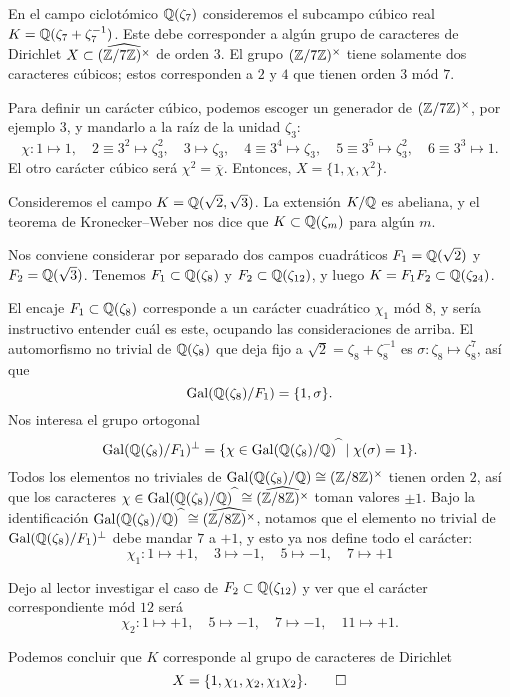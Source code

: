 \begin{ejemplo}
  \label{ej:Q-zeta-7-real-caracteres}
  En el campo ciclotómico $\mathbb{Q} (\zeta_7)$ consideremos el subcampo cúbico real
  $K = \mathbb{Q} (\zeta_7 + \zeta_7^{-1})$. Este debe corresponder a algún grupo de
  caracteres de Dirichlet $X \subset \widehat{(\mathbb{Z}/7\mathbb{Z})^\times}$ de orden $3$.
  El grupo $(\mathbb{Z}/7\mathbb{Z})^\times$ tiene solamente dos caracteres cúbicos;
  estos corresponden a $2$ y $4$ que tienen orden $3$ mód $7$.

  Para definir un carácter cúbico, podemos escoger un generador de
  $(\mathbb{Z}/7\mathbb{Z})^\times$, por ejemplo $3$, y mandarlo a la raíz de la unidad
  $\zeta_3$:
  \[ \chi\colon 1\mapsto 1, \quad
  2 \equiv 3^2 \mapsto \zeta_3^2, \quad
  3 \mapsto \zeta_3, \quad
  4 \equiv 3^4 \mapsto \zeta_3, \quad
  5 \equiv 3^5 \mapsto \zeta_3^2, \quad
  6 \equiv 3^3 \mapsto 1. \]
  El otro carácter cúbico será $\chi^2 = \overline{\chi}$. Entonces,
  $X = \{ 1, \chi, \chi^2 \}$.
\end{ejemplo}

\begin{ejemplo}
  \label{ej:sqrt-2-sqrt-3-caracteres}
  Consideremos el campo $K = \mathbb{Q} (\sqrt{2},\sqrt{3})$. La extensión $K/\mathbb{Q}$
  es abeliana, y el teorema de Kronecker--Weber nos dice que
  $K \subset \mathbb{Q} (\zeta_m)$ para algún $m$.

  Nos conviene considerar por separado dos campos cuadráticos
  $F_1 = \mathbb{Q} (\sqrt{2})$ y $F_2 = \mathbb{Q} (\sqrt{3})$.
  Tenemos $F_1 \subset \mathbb{Q} (\zeta_8)$ y $F_2 \subset \mathbb{Q} (\zeta_{12})$,
  y luego $K = F_1 F_2 \subset \mathbb{Q} (\zeta_{24})$.

  El encaje $F_1 \subset \mathbb{Q} (\zeta_8)$ corresponde a un carácter cuadrático
  $\chi_1$ mód $8$, y sería instructivo entender cuál es este, ocupando las
  consideraciones de arriba. El automorfismo no trivial de $\mathbb{Q} (\zeta_8)$
  que deja fijo a $\sqrt{2} = \zeta_8 + \zeta_8^{-1}$ es
  $\sigma\colon \zeta_8 \mapsto \zeta_8^7$, así que
  $$\operatorname{Gal} (\mathbb{Q} (\zeta_8)/F_1) = \{ 1, \sigma \}.$$
  Nos interesa el grupo ortogonal
  \[ \operatorname{Gal} (\mathbb{Q} (\zeta_8)/F_1)^\perp =
     \{ \chi \in \operatorname{Gal} (\mathbb{Q} (\zeta_8)/\mathbb{Q})^{\widehat{~}} \mid \chi (\sigma) = 1 \}. \]
  Todos los elementos no triviales de
  $\operatorname{Gal} (\mathbb{Q} (\zeta_8)/\mathbb{Q}) \cong (\mathbb{Z}/8\mathbb{Z})^\times$ tienen orden $2$,
  así que los caracteres
  $\chi\in \operatorname{Gal} (\mathbb{Q} (\zeta_8)/\mathbb{Q})^{\widehat{~}} \cong \widehat{(\mathbb{Z}/8\mathbb{Z})^\times}$
  toman valores $\pm 1$. Bajo la identificación
  $\operatorname{Gal} (\mathbb{Q} (\zeta_8)/\mathbb{Q})^{\widehat{~}} \cong \widehat{(\mathbb{Z}/8\mathbb{Z})^\times}$,
  notamos que el elemento no trivial de
  $\operatorname{Gal} (\mathbb{Q} (\zeta_8)/F_1)^\perp$ debe mandar $7$ a $+1$, y esto ya nos define
  todo el carácter:
  \[ \chi_1\colon 1 \mapsto +1, \quad
  3\mapsto -1, \quad
  5\mapsto -1, \quad
  7\mapsto +1 \]

  Dejo al lector investigar el caso de $F_2 \subset \mathbb{Q} (\zeta_{12})$ y ver que
  el carácter correspondiente mód $12$ será
  \[ \chi_2\colon 1 \mapsto +1, \quad
  5\mapsto -1, \quad
  7\mapsto -1, \quad
  11\mapsto +1. \]

  Podemos concluir que $K$ corresponde al grupo de caracteres de Dirichlet
  \[ X = \{ 1, \chi_1, \chi_2, \chi_1\chi_2 \}. \qedhere \]
\end{ejemplo}

